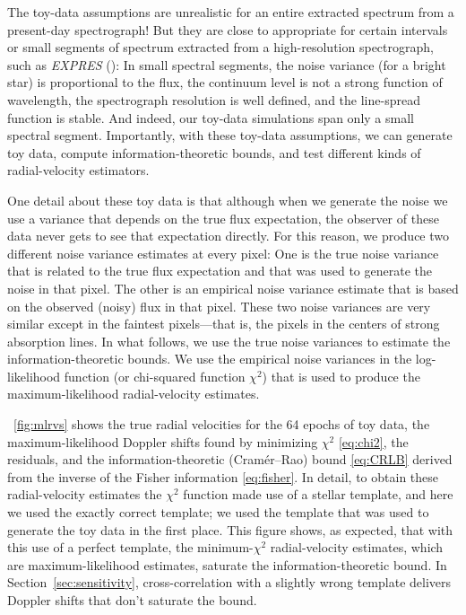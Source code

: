 \documentclass[modern]{aastex631}
\newcommand{\project}[1]{\textsl{#1}}
\newcommand{\sectionname}{Section}
\newcommand{\secref}[1]{\sectionname~\ref{#1}}
\newcommand{\figref}[1]{\figurename~\ref{#1}}
\begin{document}
The toy-data assumptions are unrealistic for an entire extracted spectrum from a present-day spectrograph!
But they are close to appropriate for certain intervals or small segments of spectrum extracted from a high-resolution spectrograph, such as \project{EXPRES} (\citealt{express}):
In small spectral segments, the noise variance (for a bright star) is proportional to the flux, the continuum level is not a strong function of wavelength, the spectrograph resolution is well defined, and the line-spread function is stable.
And indeed, our toy-data simulations span only a small spectral segment.
Importantly, with these toy-data assumptions, we can generate toy data, compute information-theoretic bounds, and test different kinds of radial-velocity estimators.

One detail about these toy data is that although when we generate the noise we use a variance that depends on the true flux expectation, the observer of these data never gets to see that expectation directly.
For this reason, we produce two different noise variance estimates at every pixel:
One is the true noise variance that is related to the true flux expectation and that was used to generate the noise in that pixel.
The other is an empirical noise variance estimate that is based on the observed (noisy) flux in that pixel.
These two noise variances are very similar except in the faintest pixels---that is, the pixels in the centers of strong absorption lines.
In what follows, we use the true noise variances to estimate the information-theoretic bounds.
We use the empirical noise variances in the log-likelihood function (or chi-squared function $\chi^2$) that is used to produce the maximum-likelihood radial-velocity estimates.

\figref{fig:mlrvs} shows the true radial velocities for the 64 epochs of toy data, the maximum-likelihood Doppler shifts found by minimizing $\chi^2$ \eqref{eq:chi2}, the residuals, and the information-theoretic (Cram\'er--Rao) bound \eqref{eq:CRLB} derived from the inverse of the Fisher information \eqref{eq:fisher}.
In detail, to obtain these radial-velocity estimates the $\chi^2$ function made use of a stellar template, and here we used the exactly correct template; we used the template that was used to generate the toy data in the first place.
This figure shows, as expected, that with this use of a perfect template, the minimum-$\chi^2$ radial-velocity estimates, which are maximum-likelihood estimates, saturate the information-theoretic bound.
In \secref{sec:sensitivity}, cross-correlation with a slightly wrong template delivers Doppler shifts that don't saturate the bound.
\end{document}
